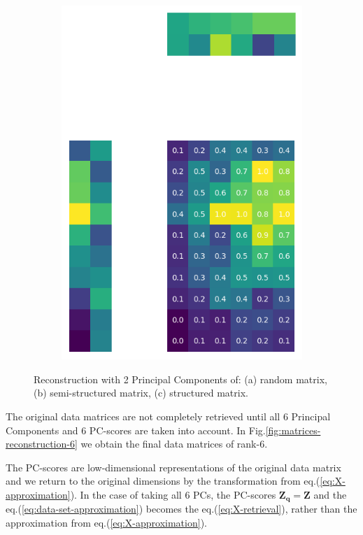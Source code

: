 \documentclass[10pt,twocolumn]{article}
\begin{document}
\begin{figure}[H]
\begin{subfigure}[t]{.15\textwidth}
\includegraphics[scale=.2]{DWGs/structured-matrix-reconstruction-PCs-2.png}
\caption{ }
\end{subfigure}
\caption{Reconstruction with 2 Principal Components of: (a) random matrix, (b) semi-structured matrix, (c) structured matrix.}
\label{fig:matrices-reconstruction-2}
\end{figure}

The original data matrices are not completely retrieved until all 6 Principal Components and 6 PC-scores are taken into account. In Fig.\ref{fig:matrices-reconstruction-6} we obtain the final data matrices of rank-6.

The PC-scores are low-dimensional representations of the original data matrix and we return to the original dimensions by the transformation from eq.(\ref{eq:X-approximation}). In the case of taking all 6 PCs, the PC-scores $\bm{Z_q} = \bm{Z}$ and the eq.(\ref{eq:data-set-approximation}) becomes the eq.(\ref{eq:X-retrieval}), rather than the approximation from eq.(\ref{eq:X-approximation}).
\end{document}

